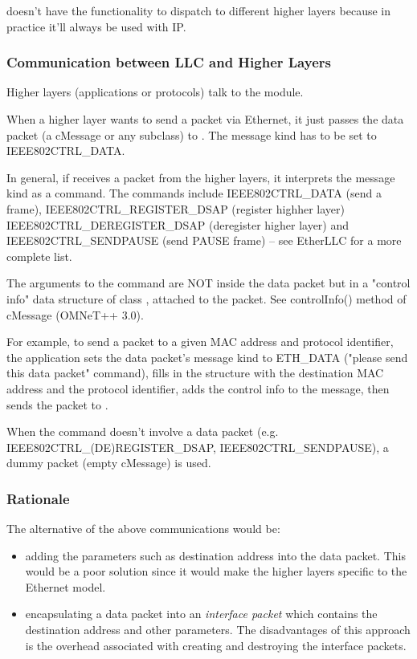  doesn't have the functionality to dispatch to different
higher layers because in practice it'll always be used with IP.

\subsubsection{Communication between LLC and Higher Layers}

Higher layers (applications or protocols) talk to the  module.

When a higher layer wants to send a packet via Ethernet, it just
passes the data packet (a cMessage or any subclass) to .
The message kind has to be set to IEEE802CTRL\_DATA.

In general, if  receives a packet from the higher layers,
it interprets the message kind as a command. The commands include
IEEE802CTRL\_DATA (send a frame), IEEE802CTRL\_REGISTER\_DSAP (register highher layer)
IEEE802CTRL\_DEREGISTER\_DSAP (deregister higher layer) and IEEE802CTRL\_SENDPAUSE
(send PAUSE frame) -- see EtherLLC for a more complete list.

The arguments to the command are NOT inside the data packet but
in a "control info" data structure of class , attached to
the packet. See controlInfo() method of cMessage (OMNeT++ 3.0).

For example, to send a packet to a given MAC address and protocol
identifier, the application sets the data packet's message kind
to ETH\_DATA ("please send this data packet" command),
fills in the  structure with the destination MAC address and
the protocol identifier, adds the control info to the message, then sends
the packet to .

When the command doesn't involve a data packet (e.g.
IEEE802CTRL\_(DE)REGISTER\_DSAP, IEEE802CTRL\_SENDPAUSE), a dummy packet
(empty cMessage) is used.

\subsubsection{Rationale}

The alternative of the above communications would be:

\begin{itemize}
  \item adding the parameters such as destination address into the data
    packet. This would be a poor solution since it would make the
    higher layers specific to the Ethernet model.
  \item encapsulating a data packet into an \textit{interface packet} which
    contains the destination address and other parameters. The
    disadvantages of this approach is the overhead associated with
    creating and destroying the interface packets.
\end{itemize}

